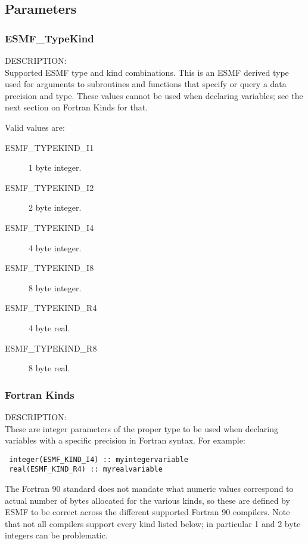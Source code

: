 \subsection{Parameters}

\subsubsection{ESMF\_TypeKind}
\label{opt:typekind}

{\sf DESCRIPTION:\\}
Supported ESMF type and kind combinations.   
This is an ESMF derived type used for arguments to subroutines 
and functions that specify or query a data precision and type.
These values cannot be used when declaring variables; see the next 
section on Fortran Kinds for that.

Valid values are:
\begin{description}
\item [ESMF\_TYPEKIND\_I1]
      1 byte integer.
\item [ESMF\_TYPEKIND\_I2]
      2 byte integer.
\item [ESMF\_TYPEKIND\_I4]
      4 byte integer.
\item [ESMF\_TYPEKIND\_I8]
      8 byte integer.
\item [ESMF\_TYPEKIND\_R4]
      4 byte real.
\item [ESMF\_TYPEKIND\_R8]
      8 byte real.
\end{description}

\subsubsection{Fortran Kinds}

{\sf DESCRIPTION:\\}
These are integer parameters of the proper type to be
used when declaring variables with a specific precision 
in Fortran syntax.  For example:
\begin{verbatim}
 integer(ESMF_KIND_I4) :: myintegervariable
 real(ESMF_KIND_R4) :: myrealvariable
\end{verbatim}
The Fortran 90 standard does not mandate what numeric values
correspond to actual number of bytes allocated for the
various kinds, so these are defined by ESMF to be correct across
the different supported Fortran 90 compilers.   Note that not
all compilers support every kind listed below; in particular
1 and 2 byte integers can be problematic.

